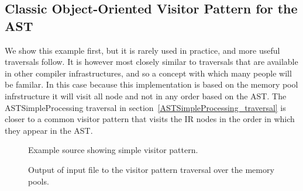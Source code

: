 \subsection{Classic Object-Oriented Visitor Pattern for the AST}

   We show this example first, but it is rarely used in practice, and
more useful traversals follow.  It is however most closely similar to
traversals that are available in other compiler infrastructures, and so
a concept with which many people will be familar.  In this case because
this implementation is based on the memory pool infrstructure it will
visit all node and not in any order based on the AST.  The ASTSimpleProcessing
traversal in section~\ref{ASTSimpleProcessing_traversal} is closer to a common 
visitor pattern that visits the IR nodes in the order in which they appear in 
the AST.

\begin{figure}[!h]
{\indent
{\mySmallFontSize

\begin{latexonly}
   
\end{latexonly}

\begin{htmlonly}
   
\end{htmlonly}

}
}
\caption{Example source showing simple visitor pattern.}
\label{Tutorial:exampleClassicVisitorPattern}
\end{figure}


\begin{figure}[!h]
{\indent
{\mySmallFontSize


\begin{latexonly}
   
\end{latexonly}

\begin{htmlonly}
   
\end{htmlonly}

}
}
\caption{Output of input file to the visitor pattern traversal over the memory pools.}
\label{Tutorial:exampleOutput_ClassicVisitorPattern}
\end{figure}

